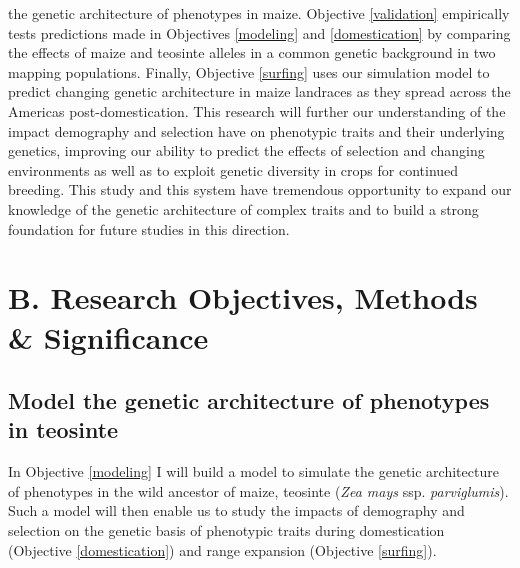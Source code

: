 the genetic architecture of phenotypes in maize.  Objective \ref{validation} empirically tests  predictions made in Objectives \ref{modeling} and \ref{domestication} by comparing the effects of maize and teosinte alleles in a common genetic background in two mapping populations. Finally, Objective \ref{surfing} uses our simulation model to predict changing genetic architecture in maize landraces as they spread across the Americas post-domestication. This research will further our understanding of the impact demography and selection have on phenotypic traits and their underlying genetics, improving our ability to predict the effects of selection and changing environments as well as to exploit genetic diversity in crops for continued breeding. This study and this system have tremendous opportunity to expand our knowledge of the genetic architecture of complex traits and to build a strong foundation for future studies in this direction. \vspace{-1ex}


\section*{B. Research Objectives, Methods \& Significance}\vspace{-1ex}

\renewcommand\thesubsection{\Roman {subsection}.}

\subsection{Model the genetic architecture of phenotypes in teosinte}\vspace{-1ex}
\label{modeling}
In Objective \ref{modeling} I will build a model to simulate the genetic architecture of phenotypes in the wild ancestor of maize, teosinte (\emph{Zea mays} ssp. \emph{parviglumis}). Such a model will then enable us to study the impacts of demography and selection on the genetic basis of phenotypic traits during domestication (Objective \ref{domestication}) and range expansion (Objective \ref{surfing}).

